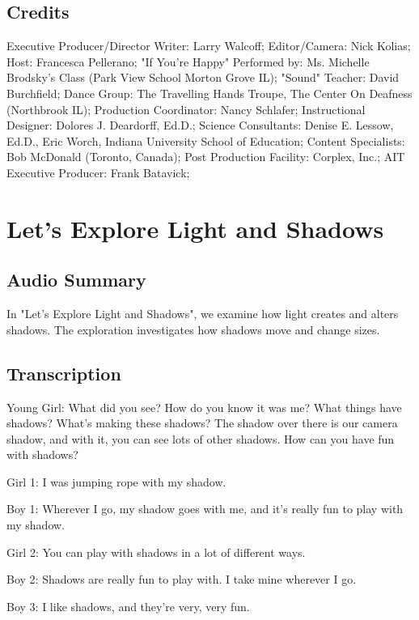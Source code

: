 \subsection{Credits}

Executive Producer/Director Writer: Larry Walcoff;
Editor/Camera: Nick Kolias;
Host: Francesca Pellerano;
"If You're Happy" Performed by: Ms. Michelle Brodsky's Class (Park View School Morton Grove IL);
"Sound" Teacher: David Burchfield;
Dance Group: The Travelling Hands Troupe, The Center On Deafness (Northbrook IL);
Production Coordinator: Nancy Schlafer;
Instructional Designer: Dolores J. Deardorff, Ed.D.;
Science Consultants: Denise E. Lessow, Ed.D., Eric Worch, Indiana University School of Education;
Content Specialists: Bob McDonald (Toronto, Canada);
Post Production Facility: Corplex, Inc.;
AIT Executive Producer: Frank Batavick;

\section{Let's Explore Light and Shadows}

\subsection{Audio Summary}

In "Let's Explore Light and Shadows", we examine how light creates and alters shadows. The exploration investigates how shadows move and change sizes.

\subsection{Transcription}

Young Girl: What did you see? How do you know it was me? What things have shadows? What's making these shadows? The shadow over there is our camera shadow, and with it, you can see lots of other shadows. How can you have fun with shadows?

Girl 1: I was jumping rope with my shadow.

Boy 1: Wherever I go, my shadow goes with me, and it's really fun to play with my shadow.

Girl 2: You can play with shadows in a lot of different ways.

Boy 2: Shadows are really fun to play with. I take mine wherever I go.

Boy 3: I like shadows, and they're very, very fun.

